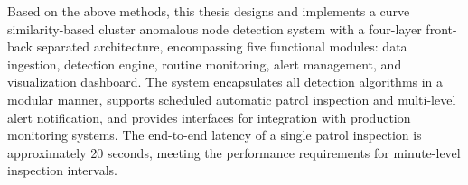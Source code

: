 Based on the above methods, this thesis designs and implements a curve similarity-based cluster anomalous node detection system with a four-layer front-back separated architecture, encompassing five functional modules: data ingestion, detection engine, routine monitoring, alert management, and visualization dashboard. The system encapsulates all detection algorithms in a modular manner, supports scheduled automatic patrol inspection and multi-level alert notification, and provides interfaces for integration with production monitoring systems. The end-to-end latency of a single patrol inspection is approximately 20 seconds, meeting the performance requirements for minute-level inspection intervals.


\pagestyle{enfrontmatterstyle}%
\cleardoublepage\pagestyle{frontmatterstyle}%

